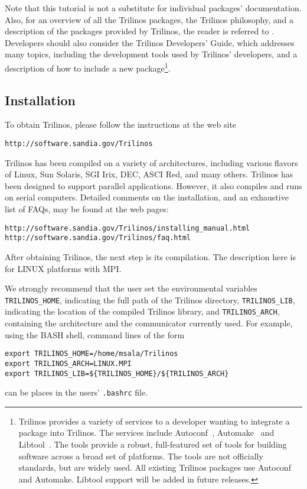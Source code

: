 Note that this tutorial is not a substitute for individual packages'
documentation. Also, for an overview of all the Trilinos packages, the
Trilinos philosophy, and a description of the packages provided by
Trilinos, the reader is referred to \cite{Trilinos-Overview}.
Developers should also consider the Trilinos Developers' Guide, which
addresses many topics, including the development tools used by Trilinos'
developers, and a description of how to include a new package\footnote{
  Trilinos provides a variety of services to a developer wanting to
  integrate a package into Trilinos.  The services include
  Autoconf~\cite{Autoconf}, Automake~\cite{Automake} and
  Libtool~\cite{Libtool}. The tools provide a robust, full-featured set
  of tools for building software across a broad set of platforms.  The
  tools are not officially standards, but are widely used.  All existing
  Trilinos packages use Autoconf and Automake.  Libtool support will be
  added in future releases.}.


\subsection{Installation}
\label{sec:installing}

To obtain Trilinos, please follow the instructions at the web site
\begin{verbatim}
http://software.sandia.gov/Trilinos
\end{verbatim}

Trilinos has been compiled on a variety of architectures, including
various flavors of Linux, Sun Solaris, SGI Irix, DEC, ASCI Red, and many
others. Trilinos has been designed to support parallel applications.
However, it also compiles and runs on serial computers.  Detailed
comments on the installation, and an exhaustive list of FAQs, may be
found at the web pages:
\begin{verbatim}
http://software.sandia.gov/Trilinos/installing_manual.html
http://software.sandia.gov/Trilinos/faq.html
\end{verbatim}

After obtaining Trilinos, the next step is its compilation. The
description here is for LINUX platforms with MPI.

We strongly recommend that the user set the environmental variables
\verb!TRILINOS_HOME!, indicating the full path of the Trilinos
directory, \verb!TRILINOS_LIB!, indicating the location of the compiled
Trilinos library, and \verb!TRILINOS_ARCH!, containing the architecture
and the communicator currently used.  For example, using the BASH shell,
command lines of the form
\begin{verbatim}
export TRILINOS_HOME=/home/msala/Trilinos
export TRILINOS_ARCH=LINUX.MPI
export TRILINOS_LIB=${TRILINOS_HOME}/${TRILINOS_ARCH}
\end{verbatim}
can be places in the users' \verb!.bashrc! file.

